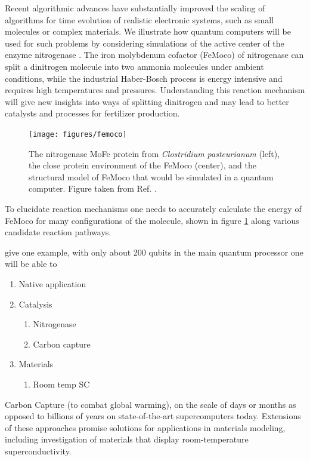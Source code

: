 \documentclass[journal]{IEEEtran}
\begin{document}
Recent algorithmic advances have substantially improved the scaling of algorithms for time evolution of realistic electronic systems, such as small molecules or complex materials. We illustrate how quantum computers will be used for such problems by considering simulations of the active center of the enzyme nitrogenase \cite{nitrogenase}. The iron molybdenum cofactor (FeMoco) of nitrogenase can split a dinitrogen molecule into two ammonia molecules under ambient conditions, while the industrial Haber-Bosch process  is energy intensive and requires high temperatures and pressures. Understanding this reaction mechanism will give new insights into ways of splitting dinitrogen and may lead to better catalysts and processes for fertilizer production.

\begin{figure}[t]
\centering
\texttt{[image: figures/femoco]}
\caption{The nitrogenase MoFe protein from {\it Clostridium pasteurianum} (left), the close protein environment of the FeMoco (center), and the structural model of FeMoco that would be simulated in a quantum computer. Figure taken from Ref. \cite{nitrogenase}.}
\label{fig:femoco}
\end{figure}


To elucidate reaction mechanisms one needs to accurately calculate the energy of FeMoco for many configurations of the molecule, shown in figure \ref{fig:femoco} along various candidate reaction pathways. 

 give one example, with only about 200 qubits in the main quantum processor one will be able to 
 
 

\begin{enumerate}
\item      Native application
\item     Catalysis
\begin{enumerate}
                               \item         Nitrogenase
                           \item        Carbon capture
\end{enumerate}
\item      Materials
 \begin{enumerate}
                           \item         Room temp SC
\end{enumerate}
\end{enumerate}


 Carbon Capture (to combat global warming), on the scale of days or months as opposed to billions of years on state-of-the-art supercomputers today.  Extensions of these approaches promise solutions for applications in materials modeling, including investigation of materials that display room-temperature superconductivity. 
\end{document}
